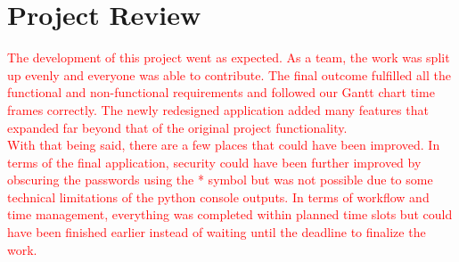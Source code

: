\documentclass[12pt, titlepage]{article}
\begin{document}
\section{Project Review}
\textcolor{red}{The development of this project went as expected. As a team, the work was split up evenly and everyone was able to contribute. The final outcome fulfilled all the functional and non-functional requirements and followed our Gantt chart time frames correctly. The newly redesigned application added many features that expanded far beyond that of the original project functionality.}\\

\textcolor{red}{With that being said, there are a few places that could have been improved. In terms of the final application, security could have been further improved by obscuring the passwords using the * symbol but was not possible due to some technical limitations of the python console outputs. In terms of workflow and time management, everything was completed within planned time slots but could have been finished earlier instead of waiting until the deadline to finalize the work. }
\end{document}

